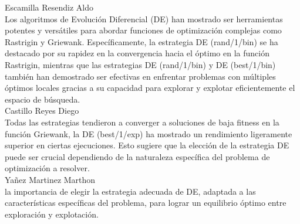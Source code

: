 \documentclass{report}
\begin{document}
Escamilla Resendiz Aldo\\
Los algoritmos de Evolución Diferencial (DE) han mostrado ser herramientas potentes y versátiles para abordar funciones de optimización complejas como Rastrigin y Griewank. Específicamente, la estrategia DE (rand/1/bin) se ha destacado por su rapidez en la convergencia hacia el óptimo en la función Rastrigin, mientras que las estrategias DE (rand/1/bin) y DE (best/1/bin) también han demostrado ser efectivas en enfrentar problemas con múltiples óptimos locales gracias a su capacidad para explorar y explotar eficientemente el espacio de búsqueda.\\
Castillo Reyes Diego\\
Todas las estrategias tendieron a converger a soluciones de baja fitness en la función Griewank, la DE (best/1/exp) ha mostrado un rendimiento ligeramente superior en ciertas ejecuciones. Esto sugiere que la elección de la estrategia DE puede ser crucial dependiendo de la naturaleza específica del problema de optimización a resolver.\\
Yañez Martinez Marthon\\
la importancia de elegir la estrategia adecuada de DE, adaptada a las características específicas del problema, para lograr un equilibrio óptimo entre exploración y explotación.
\end{document}
